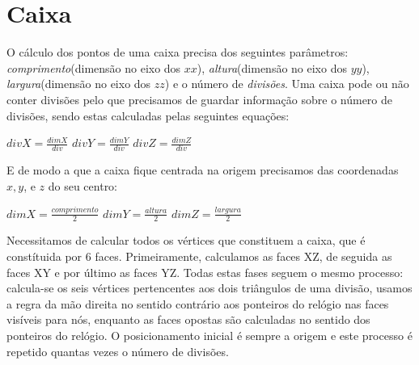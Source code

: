 \documentclass[12pt]{article}
\begin{document}
\section{Caixa}
O cálculo dos pontos de uma caixa precisa dos seguintes parâmetros: \textit{comprimento}(dimensão no eixo dos $xx$),
\textit{altura}(dimensão no eixo dos $yy$), \textit{largura}(dimensão no eixo dos $zz$) e o número de \textit{divisões}. 
Uma caixa pode ou não conter divisões pelo que precisamos de guardar informação sobre o número de divisões, sendo estas calculadas pelas seguintes equações:
\begin{center}
$divX = \frac{dimX}{div}$ \newline\newline
$divY = \frac{dimY}{div}$ \newline\newline
$divZ = \frac{dimZ}{div}$ \newline\newline
\end{center}
E de modo a que a caixa fique centrada na origem precisamos das coordenadas $x,y$, e $z$ do seu centro:
\begin{center}
$dimX = \frac{comprimento}{2}$ \newline\newline
$dimY = \frac{altura}{2}$ \newline\newline
$dimZ = \frac{largura}{2}$ \newline\newline
\end{center}
Necessitamos de calcular todos os vértices que constituem a caixa, que é constítuida por 6 faces. Primeiramente, calculamos as faces XZ, 
de seguida as faces XY e por último as faces YZ. Todas estas fases seguem o mesmo processo: calcula-se os seis vértices pertencentes aos dois triângulos
de uma divisão, usamos a regra da mão direita no sentido contrário aos ponteiros do relógio nas faces visíveis para nós, enquanto
as faces opostas são calculadas no sentido dos ponteiros do relógio. O posicionamento inicial é sempre a origem e este processo é repetido quantas vezes o número de divisões.\newline\newline
\end{document}
